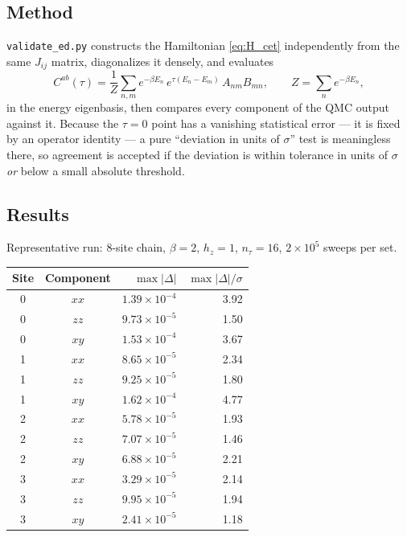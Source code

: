 \documentclass[11pt,a4paper]{article}
\newcommand{\code}[1]{\texttt{#1}}
\begin{document}
\subsection{Method}

\code{validate\_ed.py} constructs the Hamiltonian \eqref{eq:H_cet} independently
from the same $J_{ij}$ matrix, diagonalizes it densely, and evaluates
\begin{equation}
  C^{ab}(\tau) = \frac1Z \sum_{n,m} e^{-\beta E_n}\,
     e^{\tau(E_n-E_m)}\, A_{nm} B_{mn},
  \qquad Z=\sum_n e^{-\beta E_n},
\end{equation}
in the energy eigenbasis, then compares every component of the QMC output
against it. Because the $\tau=0$ point has a vanishing statistical error --- it
is fixed by an operator identity --- a pure ``deviation in units of $\sigma$''
test is meaningless there, so agreement is accepted if the deviation is within
tolerance in units of $\sigma$ \emph{or} below a small absolute threshold.

\subsection{Results}

Representative run: 8-site chain, $\beta=2$, $h_z=1$, $n_\tau=16$,
$2\times10^5$ sweeps per set.

\begin{center}
\begin{tabular}{ccrr}
\toprule
Site & Component & $\max|\Delta|$ & $\max|\Delta|/\sigma$ \\
\midrule
0 & $xx$ & $1.39\times10^{-4}$ & 3.92 \\
0 & $zz$ & $9.73\times10^{-5}$ & 1.50 \\
0 & $xy$ & $1.53\times10^{-4}$ & 3.67 \\
1 & $xx$ & $8.65\times10^{-5}$ & 2.34 \\
1 & $zz$ & $9.25\times10^{-5}$ & 1.80 \\
1 & $xy$ & $1.62\times10^{-4}$ & 4.77 \\
2 & $xx$ & $5.78\times10^{-5}$ & 1.93 \\
2 & $zz$ & $7.07\times10^{-5}$ & 1.46 \\
2 & $xy$ & $6.88\times10^{-5}$ & 2.21 \\
3 & $xx$ & $3.29\times10^{-5}$ & 2.14 \\
3 & $zz$ & $9.95\times10^{-5}$ & 1.94 \\
3 & $xy$ & $2.41\times10^{-5}$ & 1.18 \\
\bottomrule
\end{tabular}
\end{center}
\end{document}
